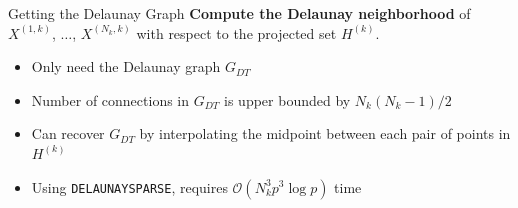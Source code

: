 \documentclass[xcolor=dvipsnames]{beamer}
\begin{document}
\begin{frame}{Getting the Delaunay Graph}
\textbf{Compute the Delaunay neighborhood} of $X^{(1,k)}$, $\ldots$,
$X^{(N_k,k)}$ with respect to the projected set $H^{(k)}$.\\
\medskip
\begin{itemize}
\item Only need the Delaunay graph $G_{DT}$
\item Number of connections in $G_{DT}$ is upper bounded by $N_k(N_k-1)/2$
\item Can recover $G_{DT}$ by interpolating the midpoint between each pair
of points in $H^{(k)}$
\item Using {\tt DELAUNAYSPARSE}, requires
$\mathcal{O}(N_k^3 p^3 \log p)$ time
\end{itemize}
\end{frame}
\end{document}
